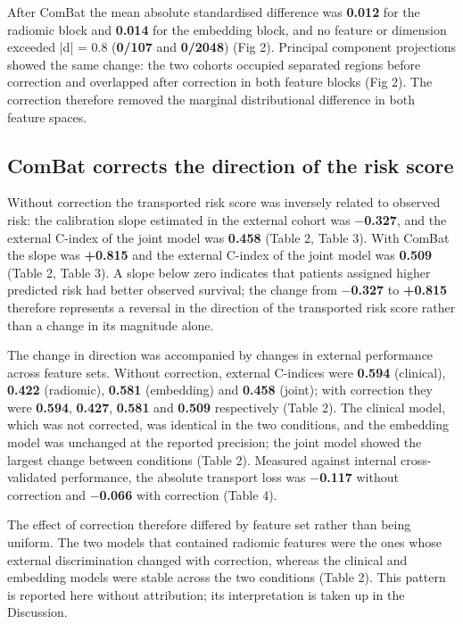 \documentclass[a4paper,fleqn]{cas-sc}
\begin{document}
After ComBat the mean absolute standardised difference was \textbf{0.012} for the radiomic block and \textbf{0.014} for the embedding block, and no feature or dimension exceeded |d| = 0.8 (\textbf{0/107} and \textbf{0/2048}) (Fig 2). Principal component projections showed the same change: the two cohorts occupied separated regions before correction and overlapped after correction in both feature blocks (Fig 2). The correction therefore removed the marginal distributional difference in both feature spaces.

\subsection{ComBat corrects the direction of the risk score}

Without correction the transported risk score was inversely related to observed risk: the calibration slope estimated in the external cohort was \textbf{$-$0.327}, and the external C-index of the joint model was \textbf{0.458} (Table 2, Table 3). With ComBat the slope was \textbf{+0.815} and the external C-index of the joint model was \textbf{0.509} (Table 2, Table 3). A slope below zero indicates that patients assigned higher predicted risk had better observed survival; the change from \textbf{$-$0.327} to \textbf{+0.815} therefore represents a reversal in the direction of the transported risk score rather than a change in its magnitude alone.

The change in direction was accompanied by changes in external performance across feature sets. Without correction, external C-indices were \textbf{0.594} (clinical), \textbf{0.422} (radiomic), \textbf{0.581} (embedding) and \textbf{0.458} (joint); with correction they were \textbf{0.594}, \textbf{0.427}, \textbf{0.581} and \textbf{0.509} respectively (Table 2). The clinical model, which was not corrected, was identical in the two conditions, and the embedding model was unchanged at the reported precision; the joint model showed the largest change between conditions (Table 2). Measured against internal cross-validated performance, the absolute transport loss was \textbf{$-$0.117} without correction and \textbf{$-$0.066} with correction (Table 4).

The effect of correction therefore differed by feature set rather than being uniform. The two models that contained radiomic features were the ones whose external discrimination changed with correction, whereas the clinical and embedding models were stable across the two conditions (Table 2). This pattern is reported here without attribution; its interpretation is taken up in the Discussion.
\end{document}
